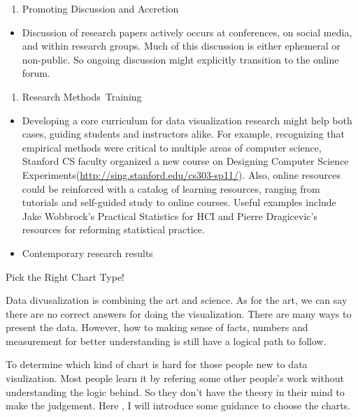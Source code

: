 \documentclass[]{book}
\providecommand{\tightlist}{%
  \setlength{\itemsep}{0pt}\setlength{\parskip}{0pt}}
\theoremstyle{definition}
\theoremstyle{definition}
\theoremstyle{definition}
\theoremstyle{remark}
\begin{document}
\begin{enumerate}
\def\labelenumi{\arabic{enumi}.}
\setcounter{enumi}{1}
\tightlist
\item
  Promoting Discussion and Accretion
\end{enumerate}

\begin{itemize}
\tightlist
\item
  Discussion of research papers actively occurs at conferences, on
  social media, and within research groups. Much of this discussion is
  either ephemeral or non-public. So ongoing discussion might explicitly
  transition to the online forum.
\end{itemize}

\begin{enumerate}
\def\labelenumi{\arabic{enumi}.}
\setcounter{enumi}{2}
\tightlist
\item
  Research Methods~Training
\end{enumerate}

\begin{itemize}
\item
  Developing a core curriculum for data visualization research might
  help both cases, guiding students and instructors alike. For example,
  recognizing that empirical methods were critical to multiple areas of
  computer science, Stanford CS faculty organized a new course on
  Designing Computer Science
  Experiments(\url{http://sing.stanford.edu/cs303-sp11/}). Also, online
  resources could be reinforced with a catalog of learning resources,
  ranging from tutorials and self-guided study to online courses. Useful
  examples include Jake Wobbrock's Practical Statistics for HCI and
  Pierre Dragicevic's resources for reforming statistical practice.
\item
  Contemporary research results
\end{itemize}

Pick the Right Chart Type!

Data divusalization is combining the art and science. As for the art, we
can say there are no correct answers for doing the visualization. There
are many ways to present the data. However, how to making sense of
facts, numbers and measurement for better understanding is still have a
logical path to follow.

To determine which kind of chart is hard for those people new to data
visulization. Most people learn it by refering some other people's work
without understanding the logic behind. So they don't have the theory in
their mind to make the judgement. Here , I will introduce some guidance
to choose the charts.
\end{document}
